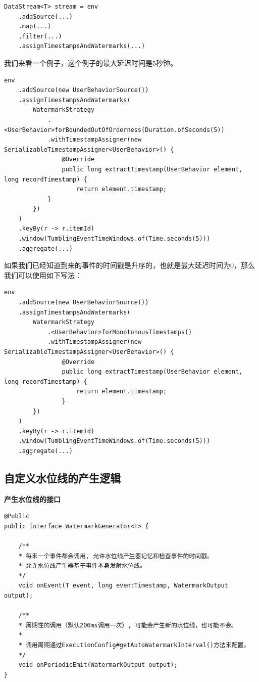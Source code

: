 \documentclass[cn,11pt,chinese]{elegantbook}
\begin{document}
\begin{verbatim}
DataStream<T> stream = env
    .addSource(...)
    .map(...)
    .filter(...)
    .assignTimestampsAndWatermarks(...)
\end{verbatim}

我们来看一个例子，这个例子的最大延迟时间是5秒钟。

\begin{verbatim}
env
    .addSource(new UserBehaviorSource())
    .assignTimestampsAndWatermarks(
        WatermarkStrategy
            .<UserBehavior>forBoundedOutOfOrderness(Duration.ofSeconds(5))
            .withTimestampAssigner(new SerializableTimestampAssigner<UserBehavior>() {
                @Override
                public long extractTimestamp(UserBehavior element, long recordTimestamp) {
                    return element.timestamp;
            }
        })
    )
    .keyBy(r -> r.itemId)
    .window(TumblingEventTimeWindows.of(Time.seconds(5)))
    .aggregate(...)
\end{verbatim}

如果我们已经知道到来的事件的时间戳是升序的，也就是最大延迟时间为0，那么我们可以使用如下写法：

\begin{verbatim}
env
    .addSource(new UserBehaviorSource())
    .assignTimestampsAndWatermarks(
        WatermarkStrategy
            .<UserBehavior>forMonotonousTimestamps()
            .withTimestampAssigner(new SerializableTimestampAssigner<UserBehavior>() {
                @Override
                public long extractTimestamp(UserBehavior element, long recordTimestamp) {
                    return element.timestamp;
                }
        })
    )
    .keyBy(r -> r.itemId)
    .window(TumblingEventTimeWindows.of(Time.seconds(5)))
    .aggregate(...)
\end{verbatim}

\subsection{自定义水位线的产生逻辑}

\textbf{产生水位线的接口}

\begin{verbatim}
@Public
public interface WatermarkGenerator<T> {
    
    /**
    * 每来一个事件都会调用, 允许水位线产生器记忆和检查事件的时间戳。
    * 允许水位线产生器基于事件本身发射水位线。
    */
    void onEvent(T event, long eventTimestamp, WatermarkOutput output);
    
    /**
    * 周期性的调用（默认200ms调用一次）, 可能会产生新的水位线，也可能不会。
    *
    * 调用周期通过ExecutionConfig#getAutoWatermarkInterval()方法来配置。
    */
    void onPeriodicEmit(WatermarkOutput output);
}
\end{verbatim}
\end{document}
